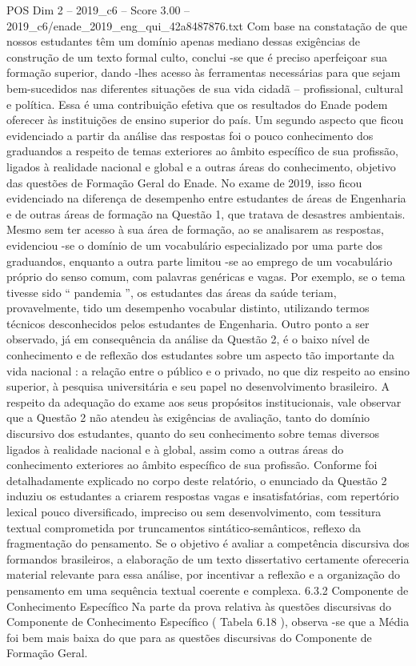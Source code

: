 \begin{textsample}{POS Dim 2 – 2019\_c6 – Score 3.00 – 2019\_c6/enade\_2019\_eng\_qui\_42a8487876.txt}
Com base na constatação de que nossos estudantes têm um domínio apenas mediano dessas exigências de construção de um texto formal culto, conclui -se que é preciso aperfeiçoar sua formação superior, dando -lhes acesso às ferramentas necessárias para que sejam bem-sucedidos nas diferentes situações de sua vida cidadã – profissional, cultural e política.
Essa é uma contribuição efetiva que os resultados do Enade podem oferecer às instituições de ensino superior do país.
Um segundo aspecto que ficou evidenciado a partir da análise das respostas foi o pouco conhecimento dos graduandos a respeito de temas exteriores ao âmbito específico de sua profissão, ligados à realidade nacional e global e a outras áreas do conhecimento, objetivo das questões de Formação Geral do Enade.
No exame de 2019, isso ficou evidenciado na diferença de desempenho entre estudantes de áreas de Engenharia e de outras áreas de formação na Questão 1, que tratava de desastres ambientais.
Mesmo sem ter acesso à sua área de formação, ao se analisarem as respostas, evidenciou -se o domínio de um vocabulário especializado por uma parte dos graduandos, enquanto a outra parte limitou -se ao emprego de um vocabulário próprio do senso comum, com palavras genéricas e vagas.
Por exemplo, se o tema tivesse sido “ pandemia ”, os estudantes das áreas da saúde teriam, provavelmente, tido um desempenho vocabular distinto, utilizando termos técnicos desconhecidos pelos estudantes de Engenharia.
Outro ponto a ser observado, já em consequência da análise da Questão 2, é o baixo nível de conhecimento e de reflexão dos estudantes sobre um aspecto tão importante da vida nacional : a relação entre o público e o privado, no que diz respeito ao ensino superior, à pesquisa universitária e seu papel no desenvolvimento brasileiro.
A respeito da adequação do exame aos seus propósitos institucionais, vale observar que a Questão 2 não atendeu às exigências de avaliação, tanto do domínio discursivo dos estudantes, quanto do seu conhecimento sobre temas diversos ligados à realidade nacional e à global, assim como a outras áreas do conhecimento exteriores ao âmbito específico de sua profissão.
Conforme foi detalhadamente explicado no corpo deste relatório, o enunciado da Questão 2 induziu os estudantes a criarem respostas vagas e insatisfatórias, com repertório lexical pouco diversificado, impreciso ou sem desenvolvimento, com tessitura textual comprometida por truncamentos sintático-semânticos, reflexo da fragmentação do pensamento.
Se o objetivo é avaliar a competência discursiva dos formandos brasileiros, a elaboração de um texto dissertativo certamente ofereceria material relevante para essa análise, por incentivar a reflexão e a organização do pensamento em uma sequência textual coerente e complexa. 6.3.2 Componente de Conhecimento Específico Na parte da prova relativa às questões discursivas do Componente de Conhecimento Específico ( Tabela 6.18 ), observa -se que a Média foi bem mais baixa do que para as questões discursivas do Componente de Formação Geral.

\end{textsample}
